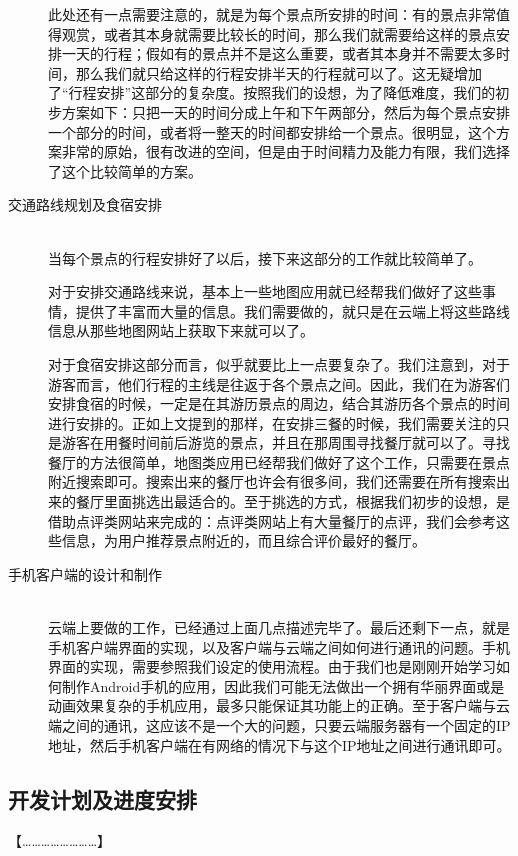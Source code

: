 \documentclass[12pt,a4paper]{article}
\begin{document}
\begin{CJK}{UTF8}{gbsn}
\begin{description}
	此处还有一点需要注意的，就是为每个景点所安排的时间：有的景点非常值得观赏，或者其本身就需要比较长的时间，那么我们就需要给这样的景点安排一天的行程；假如有的景点并不是这么重要，或者其本身并不需要太多时间，那么我们就只给这样的行程安排半天的行程就可以了。这无疑增加了“行程安排”这部分的复杂度。按照我们的设想，为了降低难度，我们的初步方案如下：只把一天的时间分成上午和下午两部分，然后为每个景点安排一个部分的时间，或者将一整天的时间都安排给一个景点。很明显，这个方案非常的原始，很有改进的空间，但是由于时间精力及能力有限，我们选择了这个比较简单的方案。
	\item[交通路线规划及食宿安排] \hfill \\
	当每个景点的行程安排好了以后，接下来这部分的工作就比较简单了。

	对于安排交通路线来说，基本上一些地图应用就已经帮我们做好了这些事情，提供了丰富而大量的信息。我们需要做的，就只是在云端上将这些路线信息从那些地图网站上获取下来就可以了。

	对于食宿安排这部分而言，似乎就要比上一点要复杂了。我们注意到，对于游客而言，他们行程的主线是往返于各个景点之间。因此，我们在为游客们安排食宿的时候，一定是在其游历景点的周边，结合其游历各个景点的时间进行安排的。正如上文提到的那样，在安排三餐的时候，我们需要关注的只是游客在用餐时间前后游览的景点，并且在那周围寻找餐厅就可以了。寻找餐厅的方法很简单，地图类应用已经帮我们做好了这个工作，只需要在景点附近搜索即可。搜索出来的餐厅也许会有很多间，我们还需要在所有搜索出来的餐厅里面挑选出最适合的。至于挑选的方式，根据我们初步的设想，是借助点评类网站来完成的：点评类网站上有大量餐厅的点评，我们会参考这些信息，为用户推荐景点附近的，而且综合评价最好的餐厅。

	\item[手机客户端的设计和制作] \hfill \\
	云端上要做的工作，已经通过上面几点描述完毕了。最后还剩下一点，就是手机客户端界面的实现，以及客户端与云端之间如何进行通讯的问题。手机界面的实现，需要参照我们设定的使用流程。由于我们也是刚刚开始学习如何制作Android手机的应用，因此我们可能无法做出一个拥有华丽界面或是动画效果复杂的手机应用，最多只能保证其功能上的正确。至于客户端与云端之间的通讯，这应该不是一个大的问题，只要云端服务器有一个固定的IP地址，然后手机客户端在有网络的情况下与这个IP地址之间进行通讯即可。

	\end{description}
	

	\subsection{开发计划及进度安排}
	{\color{red} 【……………………】}


\end{CJK}
\end{document}
